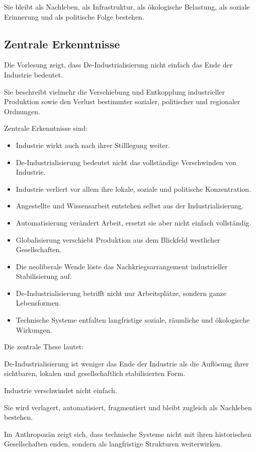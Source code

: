 Sie bleibt als Nachleben,
als Infrastruktur,
als ökologische Belastung,
als soziale Erinnerung
und als politische Folge bestehen.

\subsection{Zentrale Erkenntnisse}

Die Vorlesung zeigt,
dass De-Industrialisierung
nicht einfach das Ende der Industrie bedeutet.

Sie beschreibt vielmehr die Verschiebung
und Entkopplung industrieller Produktion
sowie den Verlust bestimmter sozialer,
politischer
und regionaler Ordnungen.

Zentrale Erkenntnisse sind:

\begin{itemize}
\item Industrie wirkt auch nach ihrer Stilllegung weiter.
\item De-Industrialisierung bedeutet nicht das vollständige Verschwinden von Industrie.
\item Industrie verliert vor allem ihre lokale, soziale und politische Konzentration.
\item Angestellte und Wissensarbeit entstehen selbst aus der Industrialisierung.
\item Automatisierung verändert Arbeit, ersetzt sie aber nicht einfach vollständig.
\item Globalisierung verschiebt Produktion aus dem Blickfeld westlicher Gesellschaften.
\item Die neoliberale Wende löste das Nachkriegsarrangement industrieller Stabilisierung auf.
\item De-Industrialisierung betrifft nicht nur Arbeitsplätze, sondern ganze Lebensformen.
\item Technische Systeme entfalten langfristige soziale, räumliche und ökologische Wirkungen.
\end{itemize}

Die zentrale These lautet:

De-Industrialisierung ist weniger das Ende der Industrie
als die Auflösung ihrer sichtbaren,
lokalen
und gesellschaftlich stabilisierten Form.

Industrie verschwindet nicht einfach.

Sie wird verlagert,
automatisiert,
fragmentiert
und bleibt zugleich als Nachleben bestehen.

Im Anthropozän zeigt sich,
dass technische Systeme
nicht mit ihren historischen Gesellschaften enden,
sondern als langfristige Strukturen weiterwirken.
